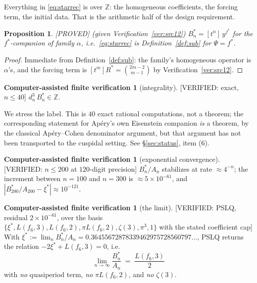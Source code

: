 \documentclass[11pt,reqno]{amsart}
\theoremstyle{plain}
\newtheorem{proposition}[theorem]{Proposition}
\theoremstyle{definition}
\newtheorem{verification}[theorem]{Computer-assisted finite verification}
\theoremstyle{remark}
\newcommand{\Z}{\mathbb{Z}}
\newcommand{\fs}{f^{*}}
\newcommand{\Proved}{\textup{\textsf{[PROVED]}}}
\newcommand{\VerifiedR}[1]{\textup{\textsf{[VERIFIED: #1]}}}
\begin{document}
Everything in \eqref{eq:starrec} is over $\Z$: the homogeneous
coefficients, the forcing term, the initial data. That is the arithmetic
half of the design requirement.

\begin{proposition}\label{prop:starrec}
\Proved{} \emph{(given Verification~\ref{ver:src12})} $B^*_n=[t^n]\,y^{\fs}$
for the $\fs$-companion of family $\alpha$, i.e.\ \eqref{eq:starrec} is
Definition~\ref{def:sub} for $\Psi=\fs$.
\end{proposition}

\begin{proof}
Immediate from Definition~\ref{def:sub}: the family's homogeneous operator
is $\alpha$'s, and the forcing term is $[t^m]R^*=\binom{2m-2}{m-1}$ by
Verification~\ref{ver:src12}.
\end{proof}

\begin{verification}[integrality]\label{ver:den12}
\VerifiedR{exact, $n\le40$} $d_n^3\,B^*_n\in\Z$.
\end{verification}

We stress the label. This is $40$ exact rational computations, not a
theorem; the corresponding statement for Ap\'ery's own Eisenstein companion
\emph{is} a theorem, by the classical Ap\'ery--Cohen denominator argument,
but that argument has not been transported to the cuspidal setting. See
\S\ref{sec:status}, item (6).

\begin{verification}[exponential convergence]\label{ver:conv}
\VerifiedR{$n\le200$ at $120$-digit precision}
$B^*_n/A_n$ stabilizes at rate $\approx4^{-n}$; the increment between
$n=100$ and $n=300$ is $\approx5\times10^{-61}$, and
$|B^*_{200}/A_{200}-\xi^*|\approx10^{-121}$.
\end{verification}

\begin{verification}[the limit]\label{ver:limit}
\VerifiedR{PSLQ, residual $2\times10^{-61}$, over the basis
$\{\xi^*,L(f_6,3),L(f_6,2),\pi L(f_6,2),\zeta(3),\pi^3,1\}$ with the stated
coefficient cap}
With $\xi^*:=\lim_nB^*_n/A_n=0.36455672878339462975728560797\ldots$, PSLQ
returns the relation $-2\xi^*+L(f_6,3)=0$, i.e.
\[
\boxed{\ \lim_{n\to\infty}\frac{B^*_n}{A_n}\;=\;\frac{L(f_6,3)}{2}\ }
\]
with \emph{no} quasiperiod term, \emph{no} $\pi L(f_6,2)$, and \emph{no}
$\zeta(3)$.
\end{verification}
\end{document}
